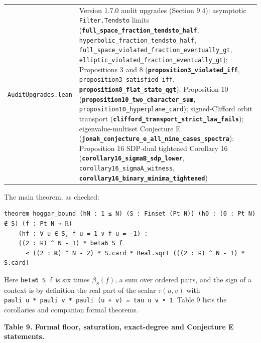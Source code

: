\documentclass[11pt,a4paper]{article}
\begin{document}
{{\begin{longtable}[]{@{}>{\raggedright\arraybackslash}p{}>{\raggedright\arraybackslash}p{}@{}}
\nolinkurl{AuditUpgrades.lean} & Version 1.7.0 audit upgrades (Section 9.4): asymptotic \texttt{Filter.Tendsto} limits (\textbf{\nolinkurl{full_space_fraction_tendsto_half}}, \nolinkurl{hyperbolic_fraction_tendsto_half}, \nolinkurl{full_space_violated_fraction_eventually_gt}, \nolinkurl{elliptic_violated_fraction_eventually_gt}); Propositions 3 and 8 (\textbf{\nolinkurl{proposition3_violated_iff}}, \nolinkurl{proposition3_satisfied_iff}, \textbf{\nolinkurl{proposition8_flat_state_qgt}}); Proposition 10 (\textbf{\nolinkurl{proposition10_two_character_sum}}, \nolinkurl{proposition10_hyperplane_card}); signed-Clifford orbit transport (\textbf{\nolinkurl{clifford_transport_strict_law_fails}}); eigenvalue-multiset Conjecture E (\textbf{\nolinkurl{jonah_conjecture_e_all_nine_cases_spectra}}); Proposition 16\textquotesingle{} SDP-dual tightened Corollary 16 (\textbf{\nolinkurl{corollary16_sigmaB_sdp_lower}}, \nolinkurl{corollary16_sigmaA_witness}, \textbf{\nolinkurl{corollary16_binary_minima_tightened}}) \\
\end{longtable}
}
}

The main theorem, as checked:

\begin{verbatim}
theorem hoggar_bound (hN : 1 ≤ N) (S : Finset (Pt N)) (h0 : (0 : Pt N) ∉ S) (f : Pt N → ℝ)
    (hf : ∀ u ∈ S, f u = 1 ∨ f u = -1) :
    ((2 : ℝ) ^ N - 1) * beta6 S f
      ≤ ((2 : ℝ) ^ N - 2) * S.card * Real.sqrt (((2 : ℝ) ^ N - 1) * S.card)
\end{verbatim}

Here \texttt{beta6\ S\ f} is six times \(\beta_S(f)\), a sum over ordered pairs, and the sign of a context is by
definition the real part of the scalar \(\tau(u,v)\) with \texttt{pauli\ u\ *\ pauli\ v\ *\ pauli\ (u\ +\ v)\ =\ tau\ u\ v\ •\ 1}.
Table 9 lists the corollaries and companion formal theorems.

\textbf{Table 9. Formal floor, saturation, exact-degree and Conjecture E statements.}
\end{document}

